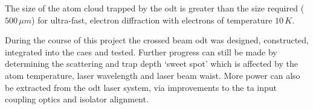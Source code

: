 The size of the atom cloud trapped by the \gls{odt} is greater than the size required ($500\,\unit{\mu m}$) for ultra-fast, electron diffraction with electrons of temperature $10\,\unit{K}$\cite{mcculloch_towards_2012}.

During the course of this project the crossed beam \gls{odt} was designed, constructed, integrated into the \gls{caes} and tested. Further progress can still be made by determining the scattering and trap depth `sweet spot' which is affected by the atom temperature, laser wavelength and laser beam waist. More power can also be extracted from the \gls{odt} laser system, via improvements to the \gls{ta} input coupling optics and isolator alignment.

